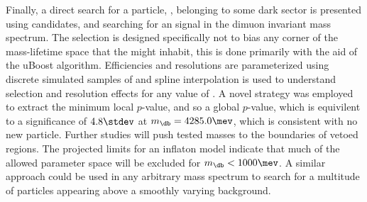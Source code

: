 


%
%
%
%


Finally, a direct search for a \np particle, \db, belonging to some dark sector is presented using
\btokstrmumu candidates, and searching for an signal in the dimuon invariant mass spectrum.
The selection is designed specifically not to bias any corner of the mass-lifetime space that the
\db might inhabit, this is done primarily with the aid of the uBoost algorithm.
Efficiencies and resolutions are parameterized using discrete simulated samples of \btokstrdb
and spline interpolation is used to understand selection and resolution effects for any value of
\mass{\db}.
A novel strategy was employed to extract the minimum local $p$-value, and so a global $p$-value,
which is equivilent to a significance of $4.8\stdev$ at $m_{\db}=4285.0\mev$, which is consistent
with no new particle.
Further studies will push tested masses to the boundaries of vetoed regions.
The projected limits for an inflaton model indicate that much of the allowed parameter space will
be excluded for $m_\db<1000\mev$.
A similar approach could be used in any arbitrary mass spectrum to search for a multitude of
particles appearing above a smoothly varying background.


